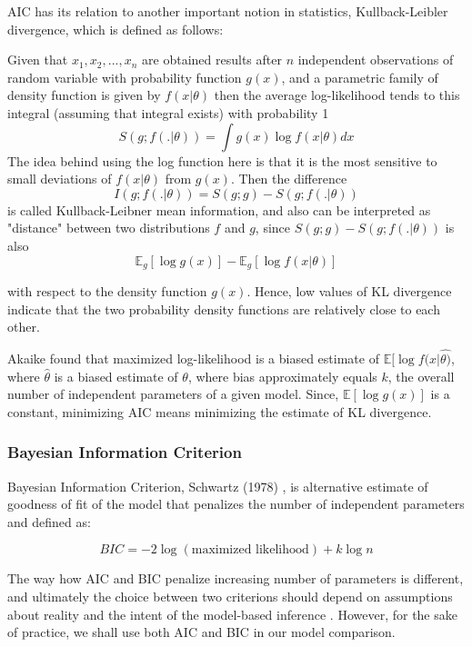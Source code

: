 \documentclass[12pt,a4paper,oneside]{book} %
\newcommand{\E}{\mathbb{E}}
\begin{document}
AIC has its relation to another important notion in statistics, Kullback-Leibler divergence, which is defined as follows:

Given that $x_1, x_2, ..., x_n$ are obtained results after $n$ independent observations of random variable with probability function $g(x)$, and a parametric family of density function is given by $f(x| \theta )$ then the average log-likelihood tends to this integral (assuming that integral exists) with probability 1
\begin{equation}
	S(g; f(.| \theta)) = \int g(x) \log f(x| \theta)dx
\end{equation}
The idea behind using the log function here is that it is the most sensitive to small deviations of $f(x| \theta)$ from $g(x)$. 
Then the difference 
\begin{equation*}
	I(g; f(.|\theta)) = S(g;g) - S(g; f(.|\theta))
\end{equation*}
is called Kullback-Leibner mean information, and also can be interpreted as "distance" between two distributions $f$ and $g$, since $S(g;g) - S(g; f(.|\theta))$ is also 
\[
	\E_{g} [\log g(x)] - \E_{g} [\log f(x|\theta)]
\]

with respect to the density function $g(x)$. Hence, low values of KL divergence indicate that the two probability density functions are relatively close to each other.

Akaike found that maximized log-likelihood is a biased estimate of 
$\E [\log f(x|\hat{\theta)}$,
 where $\hat{\theta}$ is a biased estimate of $\theta$, where bias approximately equals $k$, the overall number of independent parameters of a given model. Since, $\E [\log g(x)]$ is a constant, minimizing AIC means minimizing the estimate of KL divergence. 



\subsubsection{Bayesian Information Criterion}

Bayesian Information Criterion, Schwartz (1978) \cite{schwarz1978estimating},  is alternative estimate of goodness of fit of the model that penalizes the number of independent parameters and defined as:

\begin{equation}
	BIC = -2 \log(\text{maximized likelihood})+ k \log n
\end{equation}

The way how AIC and BIC penalize increasing number of parameters is different, and ultimately the choice between two criterions should depend on assumptions about reality and the intent of the model-based inference \cite{burnham2004multimodel}. However, for the sake of practice, we shall use both AIC and BIC in our model comparison.
\end{document}
